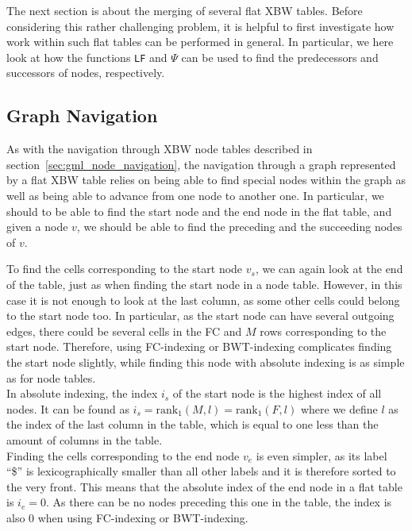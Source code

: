 \documentclass[a4paper,12pt,twoside,BCOR=10mm]{scrbook}
\begin{document}
The next section is about the merging of several flat XBW tables. 
Before considering this rather challenging problem, 
it is helpful to first investigate how work within such flat tables can be performed in general. 
In particular, we here look at how 
the functions \texttt{LF} and $ \Psi $ can be used to find the predecessors and successors 
of nodes, respectively.

\subsection{Graph Navigation}

As with the navigation through XBW node tables described in section~\ref{sec:gml_node_navigation}, 
the navigation through a graph represented by a flat XBW table relies on 
being able to find special nodes within the graph  
as well as being able to advance from one node to another one. 
In particular, we should to be able to find the start node and the end node in the flat table, 
and given a node $ v $, we should be able to find the preceding and the succeeding nodes of $ v $.

To find the cells corresponding to the start node $ v_s $, we can again look at the end of the table, 
just as when finding the start node in a node table. 
However, in this case it is not enough to look at the last column, as some other cells could belong 
to the start node too. In particular, as the start node can have several outgoing edges, 
there could be several cells in the FC and $ M $ rows corresponding to the start node. 
Therefore, using FC-indexing or BWT-indexing complicates finding the start node slightly, 
while finding this node with absolute indexing is as simple as for node tables. \\
In absolute indexing, the index $ i_s $ of the start node is the highest index of all nodes. 
It can be found as $ i_s \boldsymbol{=} \textrm{rank}_1 ( M, l ) \boldsymbol{=} \textrm{rank}_1 ( F, l ) $ where we 
define $ l $ as the index of the last column in the table, 
which is equal to one less than the amount of columns in the table. \\
Finding the cells corresponding to the end node $ v_e $ is even simpler, as its label “\$” is 
lexicographically smaller than all other labels and it is therefore sorted to the very front. 
This means that the absolute index of the end node in a flat table is $ i_e \boldsymbol{=} 0 $. 
As there can be no nodes preceding this one in the table, the index is also 0 when using 
FC-indexing or BWT-indexing.
\end{document}
